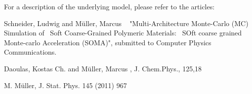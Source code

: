 For a description of the underlying model, please refer to the articles\+:
\begin{DoxyItemize}
\item Schneider, Ludwig and Müller, Marcus ~\newline
 "{}Multi-\/\+Architecture Monte-\/\+Carlo (MC) Simulation of~\newline
 Soft Coarse-\/\+Grained Polymeric Materials\+:~\newline
 SOft coarse grained Monte-\/carlo Acceleration (SOMA)"{}, submitted to Computer Physics Communications.
\item Daoulas, Kostas Ch. and Müller, Marcus , J. Chem.\+Phys., 125,18
\item M. Müller, J. Stat. Phys. 145 (2011) 967 
\end{DoxyItemize}